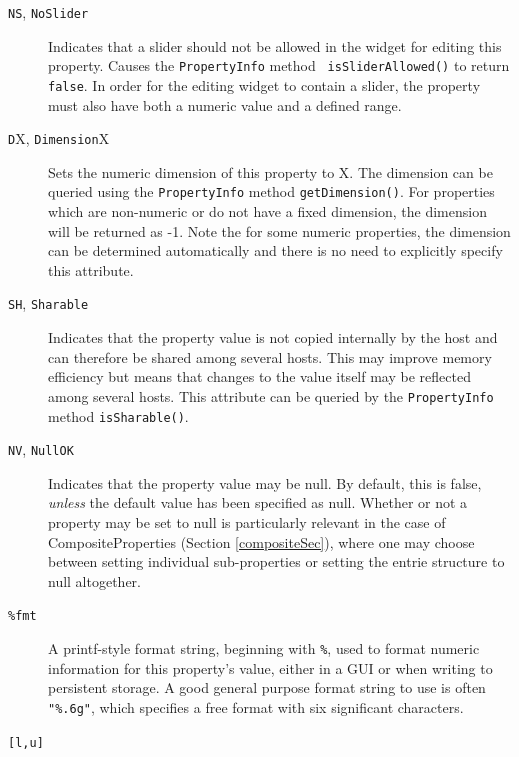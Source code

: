 \begin{description}
\item[{\tt NS}, {\tt NoSlider}] \mbox{}

Indicates that a slider should not be allowed in the widget for
editing this property. Causes the {\tt PropertyInfo} method {\tt
isSliderAllowed()} to return {\tt false}. In order for the editing
widget to contain a slider, the property must also have both a numeric
value and a defined range.

\item[{\tt D}X, {\tt Dimension}X] \mbox{}

Sets the numeric dimension of this
property to X. The dimension can be queried using the 
{\tt PropertyInfo} method {\tt getDimension()}. For properties which are
non-numeric or do not have a fixed dimension, the dimension will be
returned as -1. Note the for some numeric properties, the dimension
can be determined automatically and there is no need to explicitly
specify this attribute.

\item[{\tt SH}, {\tt Sharable}] \mbox{}

Indicates that the property value is
not copied internally by the host and can therefore be shared among
several hosts. This may improve memory efficiency but means that
changes to the value itself may be reflected among several hosts.
This attribute can be queried by the {\tt PropertyInfo} method 
{\tt isSharable()}.

\item[{\tt NV}, {\tt NullOK}] \mbox{}

Indicates that the property value 
may be null. By default, this is false, {\it unless} the
default value has been specified as null. Whether
or not a property may be set to null is particularly
relevant in the case of CompositeProperties (Section \ref{compositeSec}),
where one may choose between setting individual sub-properties or
setting the entrie structure to null altogether.

\item[{\tt \%fmt} ] \mbox{}

A printf-style format string, beginning with {\tt \%}, used to
format numeric information for this property's value, either in a GUI
or when writing to persistent storage. A good general purpose format
string to use is often {\tt "\%.6g"}, which specifies a free format with
six significant characters.

\item[{\tt [l,u]} ] \mbox{}


\end{description}
